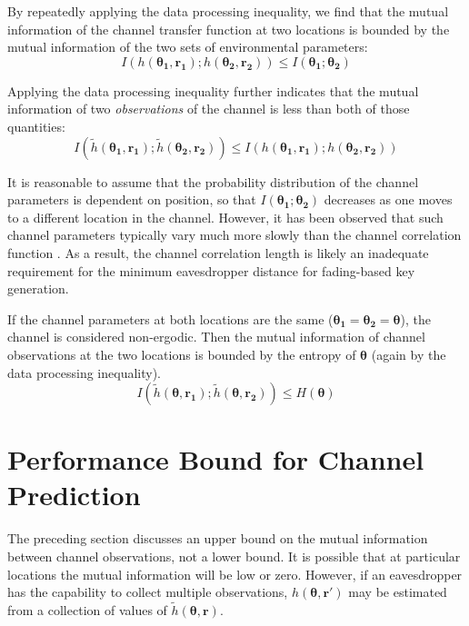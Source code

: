 \documentclass[conference]{ieeetran}
\begin{document}
By repeatedly applying the data processing inequality, we find that the mutual information of the channel transfer function at two locations is bounded by the mutual information of the two sets of environmental parameters:
\begin{equation}
I(h(\boldsymbol{\theta_1},\mathbf{r_1}); h(\boldsymbol{\theta_2},\mathbf{r_2}))\leq I(\boldsymbol{\theta_1}; \boldsymbol{\theta_2})
\end{equation}

Applying the data processing inequality further indicates that the mutual information of two \emph{observations} of the channel is less than both of those quantities:
\begin{equation}
I(\tilde{h}(\boldsymbol{\theta_1},\mathbf{r_1}); \tilde{h}(\boldsymbol{\theta_2},\mathbf{r_2}))\leq I(h(\boldsymbol{\theta_1},\mathbf{r_1}); h(\boldsymbol{\theta_2},\mathbf{r_2}))
\end{equation}

It is reasonable to assume that the probability distribution of the channel parameters is dependent on position, so that $I(\boldsymbol{\theta_1}; \boldsymbol{\theta_2})$ decreases as one moves to a different location in the channel.  However, it has been observed that such channel parameters typically vary much more slowly than the channel correlation function \cite{jakes1974, duel-hallen2007}.  As a result, the channel correlation length is likely an inadequate requirement for the minimum eavesdropper distance for fading-based key generation.

If the channel parameters at both locations are the same ($\boldsymbol{\theta_1}=\boldsymbol{\theta_2}=\boldsymbol{\theta}$), the channel is considered non-ergodic.  Then the mutual information of channel observations at the two locations is bounded by the entropy of $\boldsymbol{\theta}$ (again by the data processing inequality).
\begin{equation}
I(\tilde{h}(\boldsymbol{\theta},\mathbf{r_1}); \tilde{h}(\boldsymbol{\theta},\mathbf{r_2}))\leq H(\boldsymbol{\theta})
\end{equation}

\section{Performance Bound for Channel Prediction}

The preceding section discusses an upper bound on the mutual information between channel observations, not a lower bound.  It is possible that at particular locations the mutual information will be low or zero.  However, if an eavesdropper has the capability to collect multiple observations, $h(\boldsymbol{\theta},\mathbf{r'})$ may be estimated from a collection of values of $\tilde{h}(\boldsymbol{\theta},\mathbf{r})$.
\end{document}
